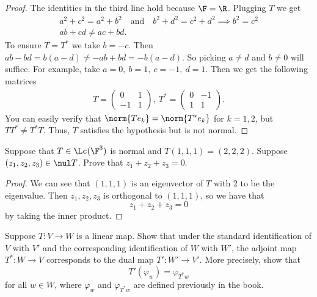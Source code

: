 \documentclass{extarticle}
\begin{document}
\begin{proof}
    The identities in the third line hold because \( \F=\R \).
    Plugging \( T \) we get
    \begin{gather*}
        a^2 + c^2 = a^2 + b^2 \quad \text{and} \quad  b^2 + d^2 = c^2 + d^2
        \implies b^2 = c^2 \\
        ab + cd \ne ac + bd.
    \end{gather*}
    To ensure \(T = T^*\) we take \( b = -c \).
    Then \( ab - bd = b(a-d) \ne -ab + bd = -b(a-d) \). So picking \( a \ne d \) and \( b \ne 0\)
    will suffice.
    For example, take \( a = 0, \ b = 1, \ c = -1, \ d = 1 \). Then we get the following
    matrices
    \begin{align*}
        T =
        \begin{pmatrix}
            0 & 1 \\
            -1 & 1
        \end{pmatrix}, \
        T^* =
        \begin{pmatrix}
            0 & -1 \\
            1 & 1
        \end{pmatrix}.
    \end{align*}
    You can easily verify that \(\norm{T e_k} = \norm{T^* e_k}\) for \( k=1, 2 \), but
    $ T T^* \ne T^* T$.
    Thus, \( T \) satisfies the hypothesis but is not normal.
\end{proof}

\begin{problem}{30}
    Suppose that \(T \in \Lc(\F^3)\) is normal and \(T(1, 1 ,1) = (2, 2, 2)\). Suppose
    \((z_1, z_2, z_3) \in \nul T\). Prove that \(z_1 + z_2 + z_3 = 0\).
\end{problem}

\begin{proof}
We can see that \((1,1,1)\) is an eigenvector of \(T\) with \(2\) to be the eigenvalue. Then
\(z_1, z_2, z_3\) is orthogonal to \((1,1,1)\), so we have that
\[z_1 + z_2 + z_3 = 0\]
by taking the inner product.
\end{proof}

\begin{problem}{32}
    Suppose \(T \colon V \to W\) is a linear map. Show that under the standard identification of
    \(V\) with \(V'\) and the corresponding identification of \(W\) with \(W'\), the adjoint map
    \(T^* \colon W \to V\) corresponds to the dual map \(T' \colon W' \to V'\). More precisely, show
    that
    \[T'(\varphi_w) = \varphi_{T^* w}\]
    for all \(w \in W\), where \(\varphi_w\) and \(\varphi_{T^* w}\) are defined previously in the
    book.
\end{problem}
\end{document}
